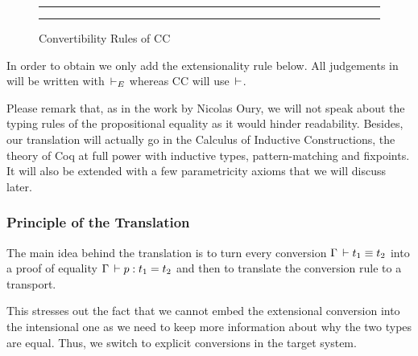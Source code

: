 \documentclass[11pt]{article}
\theoremstyle{plain}
\theoremstyle{remark}
\begin{document}
\begin{figure}[h]
  \hrule \vspace*{2ex}%

  \begin{mathc}
    \qquad
  \end{mathc}

  \begin{mathc}
  \end{mathc}

  \begin{mathc}
  \end{mathc}

  \hrule%

  \caption{Convertibility Rules of CC}
  \label{fig:cc-conv}
\end{figure}

In order to obtain \CCe we only add the extensionality rule below.
All judgements in \CCe will be written with $\,\vdash_E$ whereas CC will use $\,\vdash$.
\begin{mathc}
\end{mathc}

Please remark that, as in the work by Nicolas Oury, we will not speak about the
typing rules of the propositional equality as it would hinder readability.
Besides, our translation will actually go in the Calculus of Inductive
Constructions, the theory of Coq at full power with inductive types,
pattern-matching and fixpoints. It will also be extended with a few
parametricity axioms that we will discuss later.

\subsubsection{Principle of the Translation}

The main idea behind the translation is to turn every conversion
$\Gamma \,\vdash t_1 \equiv t_2$ into a proof of equality
$\Gamma \,\vdash p : t_1 = t_2$ and then to translate the conversion
rule to a transport.
\begin{mathc}
\end{mathc}
This stresses out the fact that we cannot embed the extensional
conversion into the intensional one as we need to keep more information
about why the two types are equal. Thus, we switch to explicit
conversions in the target system.
\end{document}

